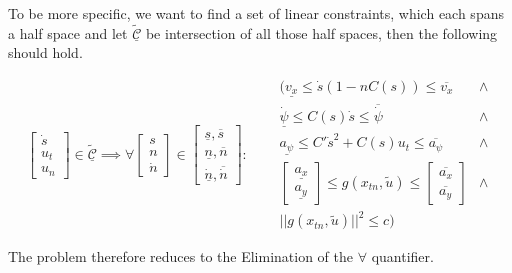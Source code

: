 To be more specific, we want to find a set of linear constraints, which each spans a half space and let $\tilde{\underline{\mathcal{C}}}$ be
intersection of all those half spaces, then the following should hold.

\begin{equation}
	\label{eq:forall_formula}
	\begin{bmatrix}
		\dot{s} \\
		u_t     \\
		u_n
	\end{bmatrix} \in \tilde{\underline{\mathcal{C}}}
	\implies
	\forall  \begin{bmatrix}
		s \\
		n \\
		\dot{n}
	\end{bmatrix} \in \begin{bmatrix}
		\underline{s}, \overline{s} \\
		\underline{n}, \overline{n} \\
		\underline{\dot{n}},  \overline{\dot{n}}
	\end{bmatrix}: \quad
	\begin{aligned}
		 & (\underline{v_x}  \leq  \dot{s}(1-nC(s))  \leq  \overline{v_x}             & \land \\
		 & \underline{\dot{\psi}} \leq C(s) \dot{s} \leq \overline{\dot{\psi}}        & \land \\
		 & \underline{a_{\psi}} \leq C' \dot{s}^2 + C(s) u_t \leq \overline{a_{\psi}} & \land \\
		 & \begin{bmatrix}
			   \underline{a_x} \\ \underline{a_y}
		   \end{bmatrix} \leq g(x_{tn}, \tilde{u}) \leq \begin{bmatrix}
			                                                \overline{a_x} \\\overline{a_y}
		                                                \end{bmatrix}               & \land   \\
		 & ||g(x_{tn}, \tilde{u})||^2 \leq c )
	\end{aligned}
\end{equation}

The problem therefore reduces to the Elimination of the $\forall$ quantifier.
